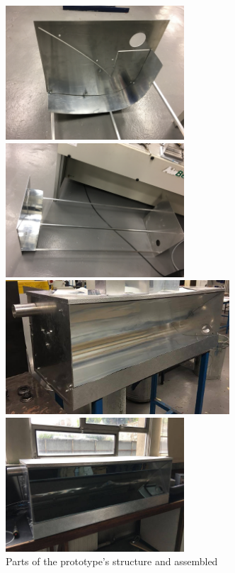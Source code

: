 \begin{figure}[ht!]
	\begin{minipage}{0.49\columnwidth}
		\includegraphics[width=0.95\columnwidth,height=5cm]{figs/Ass1.jpg}
		
		\includegraphics[width=0.95\columnwidth,height=5cm]{figs/Ass2.jpg}
	\end{minipage}
	\begin{minipage}{0.49\columnwidth}
		\includegraphics[width=0.95\columnwidth,height=5cm]{figs/Ass4.jpg}
		
		\includegraphics[width=0.95\columnwidth,height=5cm]{figs/Ass3.jpg}
		
	\end{minipage}
	\caption{Parts of the prototype's structure and assembled}
	\label{Ass11}
\end{figure}

